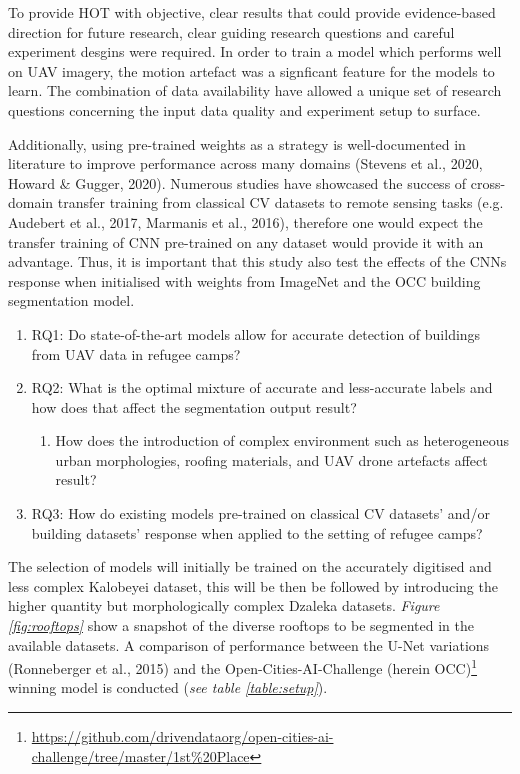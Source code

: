 \documentclass[11pt, a4paper, twoside]{report}
\begin{document}
To provide HOT with objective, clear results that could provide evidence-based direction for future research, clear guiding research questions and careful experiment desgins were required.
In order to train a model which performs well on UAV imagery, the motion artefact was a signficant feature for the models to learn. The combination of data availability have allowed a unique set of research questions concerning the input data quality and experiment setup to surface.\\\par

Additionally, using pre-trained weights as a strategy is well-documented in literature to improve performance across many domains (Stevens et al., 2020, Howard \& Gugger, 2020). Numerous studies have showcased the success of cross-domain transfer training from classical CV datasets to remote sensing tasks (e.g. Audebert et al., 2017, Marmanis et al., 2016), therefore one would expect the transfer training of CNN pre-trained on any dataset would provide it with an advantage. Thus, it is important that this study also test the effects of the CNNs response when initialised with weights from ImageNet and the OCC building segmentation model.\\\par

\begin{enumerate}
  \item RQ1: Do state-of-the-art models allow for accurate detection of buildings from UAV data in refugee camps?
  \item RQ2: What is the optimal mixture of accurate and less-accurate labels and how does that affect the segmentation output result?
  \begin{enumerate}
      \item How does the introduction of complex environment such as heterogeneous urban morphologies, roofing materials, and UAV drone artefacts affect result?
    \end{enumerate}
  \item RQ3: How do existing models pre-trained on classical CV datasets' and/or building datasets' response when applied to the setting of refugee camps?
  \end{enumerate}

The selection of models will initially be trained on the accurately digitised and less complex Kalobeyei dataset, this will be then be followed by introducing the higher quantity but morphologically complex Dzaleka datasets. \textit{Figure \ref{fig:rooftops}} show a snapshot of the diverse rooftops to be segmented in the available datasets. A comparison of performance between the U-Net variations (Ronneberger et al., 2015) and the Open-Cities-AI-Challenge (herein OCC)\footnote{\url{https://github.com/drivendataorg/open-cities-ai-challenge/tree/master/1st\%20Place}} winning model is conducted (\textit{see table \ref{table:setup}}).\\\par
\end{document}
